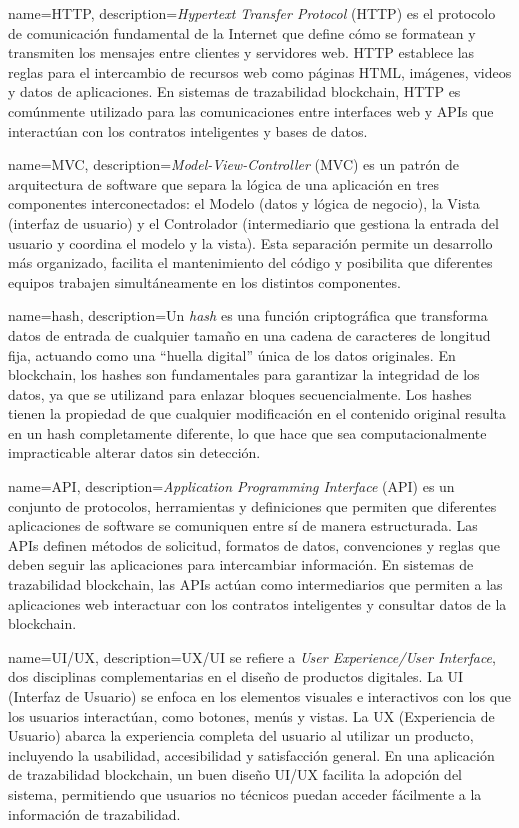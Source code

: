 {
    name=HTTP,
    description={\textit{Hypertext Transfer Protocol} (HTTP) es el protocolo de comunicación fundamental de la Internet que define cómo se formatean y transmiten los mensajes entre clientes y servidores web. HTTP establece las reglas para el intercambio de recursos web como páginas HTML, imágenes, videos y datos de aplicaciones. En sistemas de trazabilidad blockchain, HTTP es comúnmente utilizado para las comunicaciones entre interfaces web y APIs que interactúan con los contratos inteligentes y bases de datos.}
}

{
    name=MVC,
    description={\textit{Model-View-Controller} (MVC) es un patrón de arquitectura de software que separa la lógica de una aplicación en tres componentes interconectados: el Modelo (datos y lógica de negocio), la Vista (interfaz de usuario) y el Controlador (intermediario que gestiona la entrada del usuario y coordina el modelo y la vista). Esta separación permite un desarrollo más organizado, facilita el mantenimiento del código y posibilita que diferentes equipos trabajen simultáneamente en los distintos componentes.}
}

{
    name=hash,
    description={Un \textit{hash} es una función criptográfica que transforma datos de entrada de cualquier tamaño en una cadena de caracteres de longitud fija, actuando como una ``huella digital'' única de los datos originales. En blockchain, los hashes son fundamentales para garantizar la integridad de los datos, ya que se utilizand para enlazar bloques secuencialmente. Los hashes tienen la propiedad de que cualquier modificación en el contenido original resulta en un hash completamente diferente, lo que hace que sea computacionalmente impracticable alterar datos sin detección.}
}

{
    name=API,
    description={\textit{Application Programming Interface} (API) es un conjunto de protocolos, herramientas y definiciones que permiten que diferentes aplicaciones de software se comuniquen entre sí de manera estructurada. Las APIs definen métodos de solicitud, formatos de datos, convenciones y reglas que deben seguir las aplicaciones para intercambiar información. En sistemas de trazabilidad blockchain, las APIs actúan como intermediarios que permiten a las aplicaciones web interactuar con los contratos inteligentes y consultar datos de la blockchain.}
}   

{
    name=UI/UX,
    description={UX/UI se refiere a \textit{User Experience/User Interface}, dos disciplinas complementarias en el diseño de productos digitales. La UI (Interfaz de Usuario) se enfoca en los elementos visuales e interactivos con los que los usuarios interactúan, como botones, menús y vistas. La UX (Experiencia de Usuario) abarca la experiencia completa del usuario al utilizar un producto, incluyendo la usabilidad, accesibilidad y satisfacción general. En una aplicación de trazabilidad blockchain, un buen diseño UI/UX facilita la adopción del sistema, permitiendo que usuarios no técnicos puedan acceder fácilmente a la información de trazabilidad.}
}

